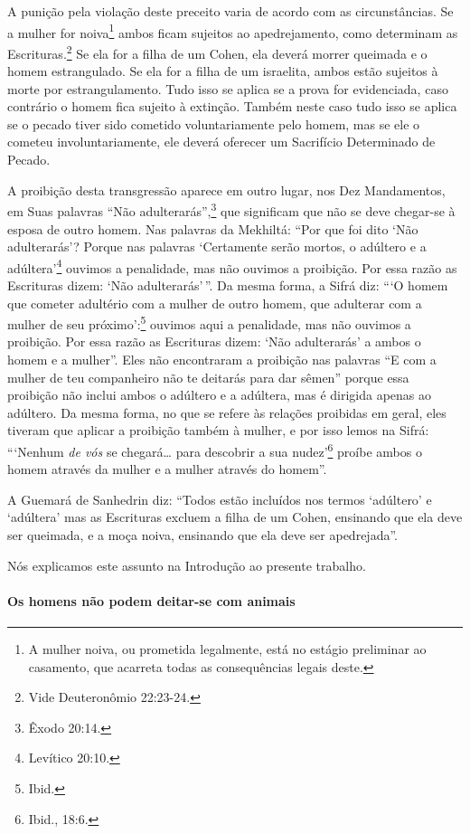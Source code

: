 A punição pela violação deste preceito varia de acordo com as
circunstâncias. Se a mulher for noiva\footnote{A mulher noiva, ou prometida legalmente, está no estágio preliminar ao casamento, que acarreta todas as consequências legais deste.} ambos ficam
sujeitos ao apedrejamento, como determinam as
Escrituras.\footnote{Vide Deuteronômio 22:23-24.} Se ela for a filha de um Cohen,
ela deverá morrer queimada e o homem estrangulado. Se ela for a filha de
um israelita, ambos estão sujeitos à morte por estrangulamento. Tudo
isso se aplica se a prova for evidenciada, caso contrário o homem fica
sujeito à extinção. Também neste caso tudo isso se aplica se o pecado
tiver sido cometido voluntariamente pelo homem, mas se ele o cometeu
involuntariamente, ele deverá oferecer um Sacrifício Determinado de
Pecado.

A proibição desta transgressão aparece em outro lugar, nos Dez
Mandamentos, em Suas palavras ``Não adulterarás'',\footnote{Êxodo 20:14.} que
significam que não se deve chegar-se à esposa de outro homem. Nas
palavras da Mekhiltá: ``Por que foi dito `Não adulterarás'? Porque nas
palavras `Certamente serão mortos, o adúltero e a adúltera'\footnote{Levítico
20:10.} ouvimos a penalidade, mas não ouvimos a proibição. Por essa razão
as Escrituras dizem: `Não adulterarás'\,''. Da mesma forma, a Sifrá diz:
```O homem que cometer adultério com a mulher de outro homem, que
adulterar com a mulher de seu próximo':\footnote{Ibid.} ouvimos aqui a
penalidade, mas não ouvimos a proibição. Por essa razão as Escrituras
dizem: `Não adulterarás' a ambos o homem e a mulher''. Eles não
encontraram a proibição nas palavras ``E com a mulher de teu
companheiro não te deitarás para dar sêmen'' porque essa proibição não
inclui ambos o adúltero e a adúltera, mas é dirigida apenas ao adúltero.
Da mesma forma, no que se refere às relações proibidas em geral, eles
tiveram que aplicar a proibição também à mulher, e por isso lemos na
Sifrá: ```Nenhum \emph{de vós} se chegará\ldots{} para descobrir a sua
nudez'\footnote{Ibid., 18:6.} proíbe ambos o homem através da mulher e a mulher
através do homem''.

A Guemará de Sanhedrin diz: ``Todos estão incluídos nos termos
`adúltero' e `adúltera' mas as Escrituras excluem a filha de um Cohen,
ensinando que ela deve ser queimada, e a moça noiva, ensinando que ela
deve ser apedrejada''.

Nós explicamos este assunto na Introdução ao presente trabalho.


\paragraph{Os homens não podem deitar-se com animais}

